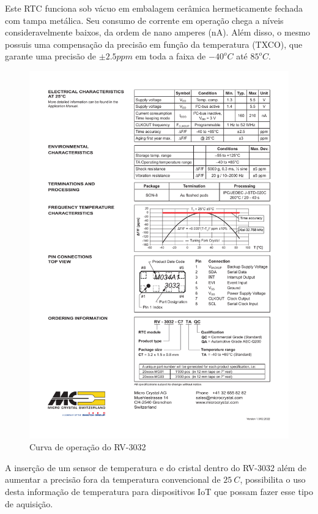 Este RTC funciona sob vácuo em embalagem cerâmica hermeticamente fechada com tampa metálica. Seu consumo de corrente em operação chega a níveis consideravelmente baixos, da ordem de nano amperes (nA). Além disso, o mesmo possuis uma compensação da precisão em função da temperatura (TXCO), que garante uma precisão de $\pm 2.5ppm$ em toda a faixa de $-40^oC$ até $85^oC$.

\begin{figure}
  \caption{Curva de operação do RV-3032}
  \begin{center}
      \includegraphics[scale=0.8]{img/RTCcurva.pdf}
  \end{center}
  \label{fig:RTC}
\end{figure}
A inserção de um sensor de temperatura e do cristal dentro do RV-3032 além de aumentar a precisão fora da temperatura convencional de $25~C$, possibilita o uso desta informação de temperatura para dispositivos IoT que possam fazer esse tipo de aquisição.
